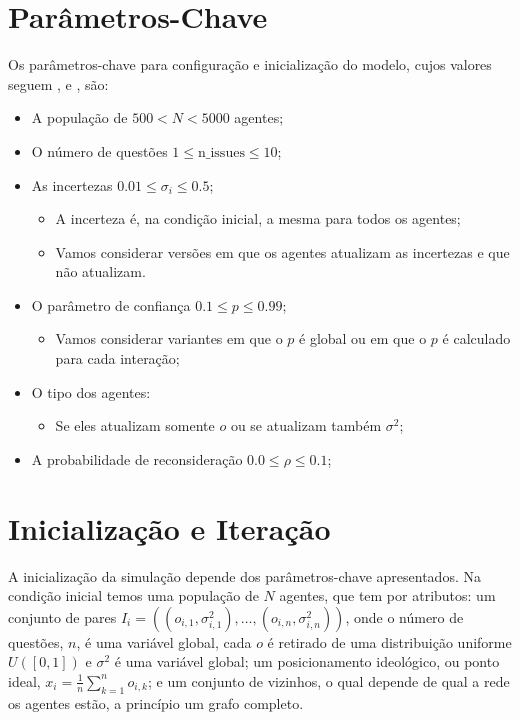 \section{Parâmetros-Chave}

Os parâmetros-chave para configuração e inicialização do modelo, cujos valores
seguem ,  e
, são:

\begin{itemize}
\item A população de \(500 < N < 5000\) agentes;
\item O número de questões \(1 \leq \text{n\_issues} \leq 10\); 

\item As incertezas \(0.01 \leq \sigma_i \leq 0.5\);
  \begin{itemize}
  \item A incerteza é, na condição inicial, a mesma para todos os agentes;
  \item Vamos considerar versões em que os agentes atualizam as incertezas e que
    não atualizam.
  \end{itemize}

\item O parâmetro de confiança \(0.1 \leq p \leq 0.99\);
  
  \begin{itemize}
  \item Vamos considerar variantes em que o \(p\) é global ou em que o \(p\) é
    calculado para cada interação;
  \end{itemize}

\item O tipo dos agentes:
  \begin{itemize}
  \item Se eles atualizam somente \(o\) ou se atualizam também \(\sigma^2\);
  \end{itemize}

\item A probabilidade de reconsideração \(0.0 \leq \rho  \leq 0.1\);
  
\end{itemize}

\section{Inicialização e Iteração}

A inicialização da simulação depende dos parâmetros-chave apresentados. Na
condição inicial temos uma população de \(N\) agentes, que tem por atributos: um
conjunto de pares \(I_i = ((o_{i,1},\sigma_{i,1}^2), \ldots, (o_{i,n},\sigma_{i,n}^2))\), onde
o número de questões, \(n\), é uma variável global, cada \(o\) é retirado de uma
distribuição uniforme \(U([0,1])\) e \(\sigma^2\) é uma variável global; um posicionamento
ideológico, ou ponto ideal, \(x_i = \frac{1}{n} \sum_{k = 1}^n o_{i,k} \); e um
conjunto de vizinhos, o qual depende de qual a rede os agentes estão, a
princípio um grafo completo.

